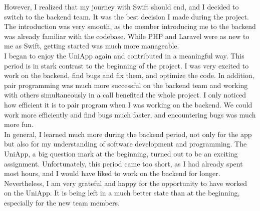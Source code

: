 \documentclass[sf-font,usefira,english]{uulm/sp/article}
\begin{document}
However, I realized that my journey with Swift should end, and I decided to switch to the backend team. 
It was the best decision I made during the project. 
The introduction was very smooth, as the member introducing me to the backend was already familiar with the codebase. 
While PHP and Laravel were as new to me as Swift, getting started was much more manageable.\\

I began to enjoy the UniApp again and contributed in a meaningful way. 
This period is in stark contrast to the beginning of the project. 
I was very excited to work on the backend, find bugs and fix them, and optimize the code. 
In addition, pair programming was much more successful on the backend team and working with others simultaneously in a call benefited the whole project. 
I only noticed how efficient it is to pair program when I was working on the backend. 
We could work more efficiently and find bugs much faster, and encountering bugs was much more fun.\\

In general, I learned much more during the backend period, not only for the app but also for my understanding of software development and programming. 
The UniApp, a big question mark at the beginning, turned out to be an exciting assignment. 
Unfortunately, this period came too short, as I had already spent most hours, and I would have liked to work on the backend for longer.\\

Nevertheless, I am very grateful and happy for the opportunity to have worked on the UniApp. 
It is being left in a much better state than at the beginning, especially for the new team members.
\end{document}
